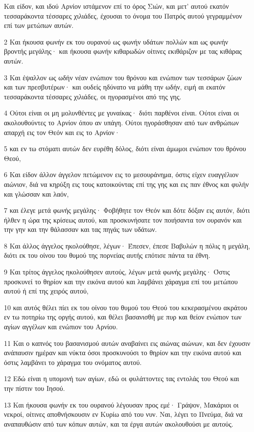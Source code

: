 \par Και είδον, και ιδού Αρνίον ιστάμενον επί το όρος Σιών, και μετ' αυτού εκατόν τεσσαράκοντα τέσσαρες χιλιάδες, έχουσαι το όνομα του Πατρός αυτού γεγραμμένον επί των μετώπων αυτών.
\par 2 Και ήκουσα φωνήν εκ του ουρανού ως φωνήν υδάτων πολλών και ως φωνήν βροντής μεγάλης· και ήκουσα φωνήν κιθαρωδών οίτινες εκιθάριζον με τας κιθάρας αυτών.
\par 3 Και έψαλλον ως ωδήν νέαν ενώπιον του θρόνου και ενώπιον των τεσσάρων ζώων και των πρεσβυτέρων· και ουδείς ηδύνατο να μάθη την ωδήν, ειμή αι εκατόν τεσσαράκοντα τέσσαρες χιλιάδες, οι ηγορασμένοι από της γης.
\par 4 Ούτοι είναι οι μη μολυνθέντες με γυναίκας· διότι παρθένοι είναι. Ούτοι είναι οι ακολουθούντες το Αρνίον όπου αν υπάγη. Ούτοι ηγοράσθησαν από των ανθρώπων απαρχή εις τον Θεόν και εις το Αρνίον·
\par 5 και εν τω στόματι αυτών δεν ευρέθη δόλος, διότι είναι άμωμοι ενώπιον του θρόνου Θεού,
\par 6 Και είδον άλλον άγγελον πετώμενον εις το μεσουράνημα, όστις είχεν ευαγγέλιον αιώνιον, διά να κηρύξη εις τους κατοικούντας επί της γης και εις παν έθνος και φυλήν και γλώσσαν και λαόν,
\par 7 και έλεγε μετά φωνής μεγάλης· Φοβήθητε τον Θεόν και δότε δόξαν εις αυτόν, διότι ήλθεν η ώρα της κρίσεως αυτού, και προσκυνήσατε τον ποιήσαντα τον ουρανόν και την γην και την θάλασσαν και τας πηγάς των υδάτων.
\par 8 Και άλλος άγγελος ηκολούθησε, λέγων· Έπεσεν, έπεσε Βαβυλών η πόλις η μεγάλη, διότι εκ του οίνου του θυμού της πορνείας αυτής επότισε πάντα τα έθνη.
\par 9 Και τρίτος άγγελος ηκολούθησεν αυτούς, λέγων μετά φωνής μεγάλης· Όστις προσκυνεί το θηρίον και την εικόνα αυτού και λαμβάνει χάραγμα επί του μετώπου αυτού ή επί της χειρός αυτού,
\par 10 και αυτός θέλει πίει εκ του οίνου του θυμού του Θεού του κεκερασμένου ακράτου εν τω ποτηρίω της οργής αυτού, και θέλει βασανισθή με πυρ και θείον ενώπιον των αγίων αγγέλων και ενώπιον του Αρνίου.
\par 11 Και ο καπνός του βασανισμού αυτών αναβαίνει εις αιώνας αιώνων, και δεν έχουσιν ανάπαυσιν ημέραν και νύκτα όσοι προσκυνούσι το θηρίον και την εικόνα αυτού και όστις λαμβάνει το χάραγμα του ονόματος αυτού.
\par 12 Εδώ είναι η υπομονή των αγίων, εδώ οι φυλάττοντες τας εντολάς του Θεού και την πίστιν του Ιησού.
\par 13 Και ήκουσα φωνήν εκ του ουρανού λέγουσαν προς εμέ· Γράψον, Μακάριοι οι νεκροί, οίτινες αποθνήσκουσιν εν Κυρίω από του νυν. Ναι, λέγει το Πνεύμα, διά να αναπαυθώσιν από των κόπων αυτών, και τα έργα αυτών ακολουθούσι με αυτούς.
